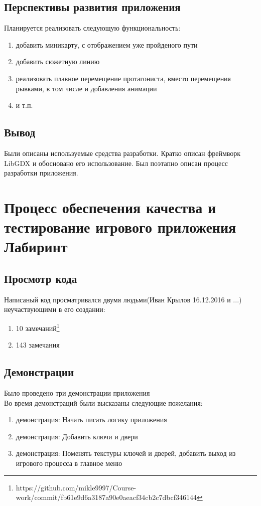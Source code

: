\subsection{Перспективы развития приложения}

Планируется реализовать следующую функциональность:
\begin{enumerate}
\item[•]  добавить миникарту, с отображением уже пройденого пути
\item[•]  добавить сюжетную линию
\item[•]  реализовать плавное перемещение протагониста, вместо перемещения рывками, в том числе и добавления анимации
\item[•]  и т.п.
\end{enumerate}

\subsection{Вывод}

Были описаны используемые средства разработки. Кратко описан фреймворк LibGDX и обосновано его использование. Был поэтапно описан процесс разработки приложения.

\section{Процесс обеспечения качества и тестирование игрового приложения Лабиринт}

\subsection{Просмотр кода}
Написаный код просматривался двумя людьми(Иван Крылов 16.12.2016 и ...) неучаствующими в его создании:
\begin{enumerate}
\item[•]  10 замечаний\footnote{https://github.com/mikle9997/Course-work/commit/fb61e9d6a3187a90e0aeacf34cb2c7dbcf346144}
\item[•]  143 замечания
\end{enumerate}

\subsection{Демонстрации}
Было проведено три демонстрации приложения\\

Во время демонстраций были высказаны следующие пожелания:
\begin{enumerate}
\item[1]  демонстрация: Начать писать логику приложения
\item[2]  демонстрация: Добавить ключи и двери
\item[3]  демонстрация: Поменять текстуры ключей и дверей, добавить выход из игрового процесса в главное меню
\end{enumerate}

